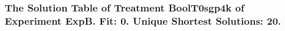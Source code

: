  \begin{frame}
 \fontsize{8pt}{9pt}\selectfont
 \frametitle{ The Solution Table of Treatment BoolT0sgp4k of Experiment ExpB. Fit: 0. Unique Shortest Solutions: 20. }

 \label{ExpBSolutionTable002.tex}  
 \end{frame}

